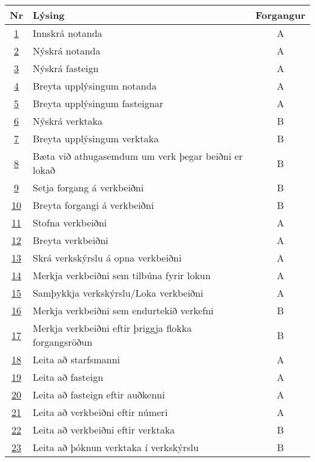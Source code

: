\documentclass[a4paper]{article}
\begin{document}
\begin{tabular}{|c|p{10cm}|c|}
\hline
Nr&Lýsing&Forgangur\\
\hline
\hyperref[tab:use_case_1]{1}&Innskrá notanda&A\\
\hline
\hyperref[tab:use_case_2]{2}&Nýskrá notanda&A\\
\hline
\hyperref[tab:use_case_3]{3}&Nýskrá fasteign&A\\
\hline
\hyperref[tab:use_case_4]{4}&Breyta upplýsingum notanda&A\\
\hline
\hyperref[tab:use_case_5]{5}&Breyta upplýsingum fasteignar&A\\
\hline
\hyperref[tab:use_case_6]{6}&Nýskrá verktaka&B\\
\hline
\hyperref[tab:use_case_7]{7}&Breyta upplýsingum verktaka&B\\
\hline
\hyperref[tab:use_case_8]{8}&Bæta við athugasemdum um verk þegar beiðni er lokað&B\\
\hline
\hyperref[tab:use_case_9]{9}&Setja forgang á verkbeiðni&B\\
\hline
\hyperref[tab:use_case_10]{10}&Breyta forgangi á verkbeiðni&B\\
\hline
\hyperref[tab:use_case_11]{11}&Stofna verkbeiðni&A\\
\hline
\hyperref[tab:use_case_12]{12}&Breyta verkbeiðni&A\\
\hline
\hyperref[tab:use_case_13]{13}&Skrá verkskýrslu á opna verkbeiðni&A\\
\hline
\hyperref[tab:use_case_14]{14}&Merkja verkbeiðni sem tilbúna fyrir lokun&A\\
\hline
\hyperref[tab:use_case_15]{15}&Samþykkja verkskýrslu/Loka verkbeiðni&A\\
\hline
\hyperref[tab:use_case_16]{16}&Merkja verkbeiðni sem endurtekið verkefni&B\\
\hline
\hyperref[tab:use_case_17]{17}&Merkja verkbeiðni eftir þriggja flokka forgangsröðun&B\\
\hline
\hyperref[tab:use_case_18]{18}&Leita að starfsmanni&A\\
\hline
\hyperref[tab:use_case_19]{19}&Leita að fasteign&A\\
\hline
\hyperref[tab:use_case_20]{20}&Leita að fasteign eftir auðkenni&A\\
\hline
\hyperref[tab:use_case_21]{21}&Leita að verkbeiðni eftir númeri&A\\
\hline
\hyperref[tab:use_case_22]{22}&Leita að verkbeiðni eftir verktaka&B\\
\hline
\hyperref[tab:use_case_23]{23}&Leita að þóknun verktaka í verkskýrslu&B\\

\end{tabular}
\end{document}
